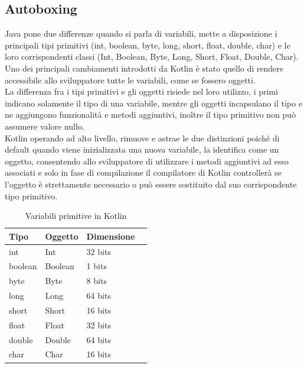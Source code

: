 \subsection{Autoboxing}
Java pone due differenze quando si parla di variabili, mette a disposizione i principali tipi primitivi (int, boolean, byte, long, short, float, double, char) e le loro corrispondenti classi (Int, Boolean, Byte, Long, Short, Float, Double, Char).\\
Uno dei principali cambiamenti introdotti da Kotlin è stato quello di rendere accessibile allo sviluppatore tutte le variabili, come se fossero oggetti.\\
La differenza fra i tipi primitivi e gli oggetti risiede nel loro utilizzo, i primi indicano solamente il tipo di una variabile, mentre gli oggetti incapsulano il tipo e ne aggiungono funzionalità e metodi aggiuntivi, inoltre il tipo primitivo non può assumere valore nullo. \\
Kotlin operando ad alto livello, rimuove e astrae le due distinzioni poiché di default quando viene inizializzata una nuova variabile, la identifica come un oggetto, consentendo allo sviluppatore di utilizzare i metodi aggiuntivi ad esso associati e solo in fase di compilazione il compilatore di Kotlin controllerà se l'oggetto è strettamente necessario o può essere sostituito dal suo corrispondente tipo primitivo.


\begin{table}[h]
\begin{center}
    \begin{tabular}{ | l | l | l | l |} \hline
    \textbf{Tipo} & \textbf{Oggetto} & \textbf{Dimensione} \\ \hline
    int & Int & 32 bits\\ \hline
    boolean & Boolean & 1 bits\\ \hline
    byte & Byte & 8 bits\\ \hline
    long & Long & 64 bits\\ \hline
    short & Short & 16 bits\\ \hline
    float & Float & 32 bits\\ \hline
    double & Double & 64 bits\\ \hline
    char & Char & 16 bits\\ \hline
\end{tabular}
\caption[Variabili primitive Kotlin]{Variabili primitive in Kotlin}\label{tab:Variabili primitive in Kotlin}
\end{center}
\end{table}

